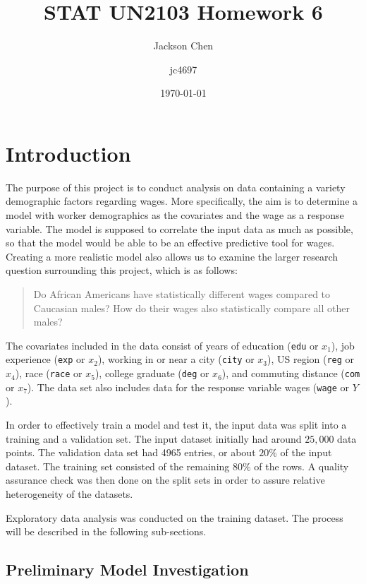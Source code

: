 \documentclass{article}
\title{STAT UN2103 Homework 6}
\author{
  Jackson Chen
  \and
  jc4697
}
\date{\today}
\begin{document}
  \maketitle

  \section{Introduction}

    The purpose of this project is to conduct analysis on data containing a variety
    demographic factors regarding wages. More specifically, the aim is to determine
    a model with worker demographics as the covariates and the wage as a response variable.
    The model is supposed to correlate the input data as much as possible, so that the
    model would be able to be an effective predictive tool for wages. Creating a more
    realistic model also allows us to examine the larger research question surrounding
    this project, which is as follows:
    \begin{quote}
      Do African Americans have statistically different wages compared to Caucasian males?
      How do their wages also statistically compare all other males?
    \end{quote}

    The covariates included in the data consist of years of education (\texttt{edu} or $x_1$),
    job experience (\texttt{exp} or $x_2$), working in or near a city (\texttt{city} or $x_3$),
    US region (\texttt{reg} or $x_4$), race (\texttt{race} or $x_5$), college graduate
    (\texttt{deg} or $x_6$), and commuting distance (\texttt{com} or $x_7$). The data
    set also includes data for the response variable wages (\texttt{wage} or $Y$).

    In order to effectively train a model and test it, the input data was split into
    a training and a validation set. The input dataset initially had around $25,000$
    data points. The validation data set had 4965 entries, or about
    $20\%$ of the input dataset. The training set consisted of the remaining $80\%$ of
    the rows. A quality assurance check was then done on the split sets in order to assure
    relative heterogeneity of the datasets.

    Exploratory data analysis was conducted on the training dataset. The process will be
    described in the following sub-sections.

    \subsection{Preliminary Model Investigation}
\end{document}
